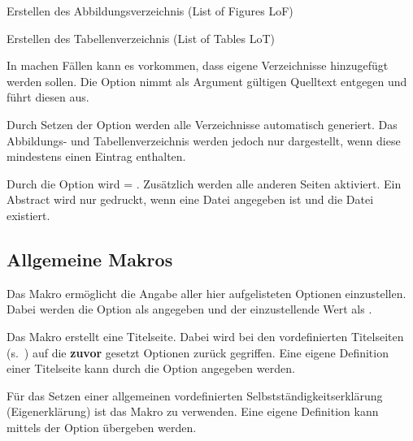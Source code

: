 \documentclass[babel=ngerman,highlight=false]{skdoc}
\begin{document}
                Erstellen des Abbildungsverzeichnis (List of Figures LoF)
                \medskip
                
                Erstellen des Tabellenverzeichnis (List of Tables LoT)
                \medskip
                
                In machen Fällen kann es vorkommen, dass eigene Verzeichnisse hinzugefügt werden sollen. Die Option  nimmt als Argument gültigen \LaTeXe Quelltext entgegen und führt diesen aus.\medskip
                
                Durch Setzen der Option werden alle Verzeichnisse automatisch generiert. Das Abbildungs- und Tabellenverzeichnis werden jedoch nur dargestellt, wenn diese mindestens einen Eintrag enthalten.
                \medskip
                
                Durch die Option wird  = . Zusätzlich werden alle anderen Seiten aktiviert. Ein Abstract wird nur gedruckt, wenn eine Datei angegeben ist und die Datei existiert.
                \medskip

        \subsection{Allgemeine Makros}\label{subsec:macro}
            \DescribeMacro{} Das Makro ermöglicht die Angabe aller hier aufgelisteten Optionen einzustellen. Dabei werden die Option als  angegeben und der einzustellende Wert als .

            \DescribeMacro\dhbwtitlepage{} Das Makro erstellt eine Titelseite. Dabei wird bei den vordefinierten Titelseiten (s.~) auf die \textbf{zuvor} gesetzt Optionen zurück gegriffen. Eine eigene Definition einer Titelseite kann durch die Option  angegeben werden.

            \DescribeMacro\dhbwdeclaration{} Für das Setzen einer allgemeinen vordefinierten Selbstständigkeitserklärung (Eigenerklärung) ist das Makro zu verwenden. Eine eigene Definition kann mittels der Option  übergeben werden.
            
\end{document}
